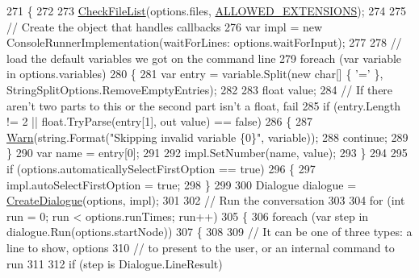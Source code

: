 \begin{DoxyCode}
271         \{
272 
273             \hyperlink{a00171_ad77564b25725a771f0fd4da430582e6f}{CheckFileList}(options.files, \hyperlink{a00171_a0979de7ea02c8c0375b8220a12e6575e}{ALLOWED\_EXTENSIONS});
274 
275             \textcolor{comment}{// Create the object that handles callbacks}
276             var impl = \textcolor{keyword}{new} ConsoleRunnerImplementation(waitForLines: options.waitForInput);
277 
278             \textcolor{comment}{// load the default variables we got on the command line}
279             \textcolor{keywordflow}{foreach} (var variable \textcolor{keywordflow}{in} options.variables)
280             \{
281                 var entry = variable.Split(\textcolor{keyword}{new} \textcolor{keywordtype}{char}[] \{ \textcolor{charliteral}{'='} \}, StringSplitOptions.RemoveEmptyEntries);
282 
283                 \textcolor{keywordtype}{float} value;
284                 \textcolor{comment}{// If there aren't two parts to this or the second part isn't a float, fail}
285                 \textcolor{keywordflow}{if} (entry.Length != 2 || \textcolor{keywordtype}{float}.TryParse(entry[1], out value) == \textcolor{keyword}{false})
286                 \{
287                     \hyperlink{a00171_a979bb6f049b6c5294f745a19e24ddd9d}{Warn}(\textcolor{keywordtype}{string}.Format(\textcolor{stringliteral}{"Skipping invalid variable \{0\}"}, variable));
288                     \textcolor{keywordflow}{continue};
289                 \}
290                 var name = entry[0];
291 
292                 impl.SetNumber(name, value);
293             \}
294 
295             \textcolor{keywordflow}{if} (options.automaticallySelectFirstOption == \textcolor{keyword}{true})
296             \{
297                 impl.autoSelectFirstOption = \textcolor{keyword}{true};
298             \}
299 
300             Dialogue dialogue = \hyperlink{a00171_aab244361a510cee18ad2f636d110e0d5}{CreateDialogue}(options, impl);
301 
302             \textcolor{comment}{// Run the conversation}
303 
304             \textcolor{keywordflow}{for} (\textcolor{keywordtype}{int} run = 0; run < options.runTimes; run++)
305             \{
306                 \textcolor{keywordflow}{foreach} (var step \textcolor{keywordflow}{in} dialogue.Run(options.startNode))
307                 \{
308 
309                     \textcolor{comment}{// It can be one of three types: a line to show, options}
310                     \textcolor{comment}{// to present to the user, or an internal command to run}
311 
312                     \textcolor{keywordflow}{if} (step is Dialogue.LineResult)

\end{DoxyCode}
